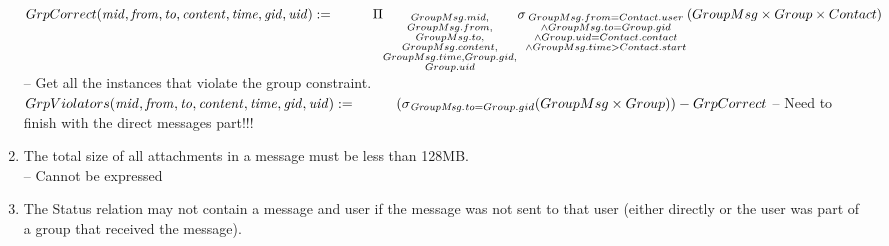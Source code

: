 \documentclass{article}
\newcommand{\var}[1]{\mathit{#1}}
\begin{document}
\begin{enumerate}
{$
GrpCorrect(\var{mid}, \var{from}, \var{to}, \var{content}, \var{time}, \var{gid}, \var{uid}) := \\ [5pt]
\hspace*{1cm} \Pi_{\substack{GroupMsg.mid, \\
							GroupMsg.from, \\
							GroupMsg.to, \\
							GroupMsg.content, \\
							GroupMsg.time,
							Group.gid, \\
							Group.uid}}
			\sigma_{\substack{GroupMsg.from = Contact.user \\
					\wedge GroupMsg.to = Group.gid \\
					\wedge Group.uid = Contact.contact \\
					\wedge GroupMsg.time > Contact.start}}
			(GroupMsg \times Group \times Contact) \\ [5pt]
$
\hspace*{1cm} -- Get all the instances that violate the group constraint. \\ [5pt]
$
GrpViolators(\var{mid}, \var{from}, \var{to}, \var{content}, \var{time}, \var{gid}, \var{uid}) := \\
	\hspace*{1cm}
	(\sigma_{\var{GroupMsg.to} = {Group.gid}}
	(GroupMsg \times Group )) - GrpCorrect \\ [5pt]
$
\hspace*{1cm} -- Need to finish with the direct messages part!!! \\ [5pt]
}
\item %
The total size of all attachments in a message must be less than 128MB. \\[5pt]
\hspace*{1cm} -- Cannot be expressed

 
\item
The Status relation may not contain a message and user if the message was not sent to that user (either directly or the user was part of a group that received the message).

\end{enumerate}
\end{document}
